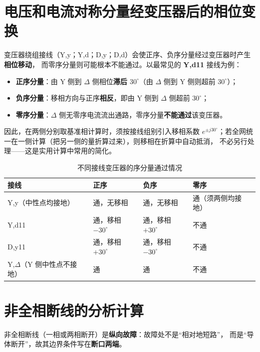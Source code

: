 \section{电压和电流对称分量经变压器后的相位变换}

变压器绕组接线（Y,y；Y,d；D,y；D,d）会使正序、负序分量经过变压器时产生\textbf{相位移动}，
而零序分量则可能根本不能通过。以最常见的 \textbf{Y,d11} 接线为例：
\begin{itemize}
  \item \textbf{正序分量}：由 Y 侧到 $\Delta$ 侧相位\textbf{滞后 $30^\circ$}（由 $\Delta$ 侧到 Y 侧则超前 $30^\circ$）；
  \item \textbf{负序分量}：移相方向与正序\textbf{相反}，即由 Y 侧到 $\Delta$ 侧超前 $30^\circ$；
  \item \textbf{零序分量}：$\Delta$ 侧无零序电流流出通路，零序分量\textbf{不能通过}该变压器。
\end{itemize}
因此，在两侧分别取基准相计算时，须按接线组别引入移相系数
$e^{\pm j30^\circ}$；若全网统一在一侧计算（把另一侧的量折算过来），则移相在折算中自动抵消，
不必另行处理——这是实用计算中常用的简化。

\begin{table}[htbp]
  \centering
  \caption{不同接线变压器的序分量通过情况}
  \small
  \begin{tabular}{@{}llll@{}}
    \toprule
    接线 & 正序 & 负序 & 零序 \\
    \midrule
    Y,y（中性点均接地） & 通，无移相 & 通，无移相 & 通（须两侧均接地） \\
    Y,d11 & 通，移相 $-30^\circ$ & 通，移相 $+30^\circ$ & 不通 \\
    D,y11 & 通，移相 $+30^\circ$ & 通，移相 $-30^\circ$ & 不通 \\
    Y,$\Delta$（Y 侧中性点不接地） & 通 & 通 & 不通 \\
    \bottomrule
  \end{tabular}
\end{table}


\section{非全相断线的分析计算}

非全相断线（一相或两相断开）是\textbf{纵向故障}：故障处不是“相对地短路”，
而是“导体断开”，故其边界条件写在\textbf{断口两端}。

